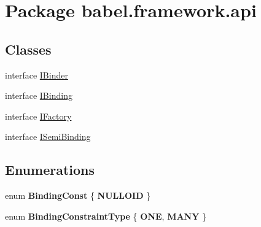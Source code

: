 \hypertarget{namespacebabel_1_1framework_1_1api}{\section{Package babel.\-framework.\-api}
\label{namespacebabel_1_1framework_1_1api}
}
\subsection*{Classes}
\begin{DoxyCompactItemize}
\item 
interface \hyperlink{interfacebabel_1_1framework_1_1api_1_1_i_binder}{I\-Binder}
\item 
interface \hyperlink{interfacebabel_1_1framework_1_1api_1_1_i_binding}{I\-Binding}
\item 
interface \hyperlink{interfacebabel_1_1framework_1_1api_1_1_i_factory}{I\-Factory}
\item 
interface \hyperlink{interfacebabel_1_1framework_1_1api_1_1_i_semi_binding}{I\-Semi\-Binding}
\end{DoxyCompactItemize}
\subsection*{Enumerations}
\begin{DoxyCompactItemize}
\item 
enum {\bfseries Binding\-Const} \{ {\bfseries N\-U\-L\-L\-O\-I\-D}
 \}
\item 
enum {\bfseries Binding\-Constraint\-Type} \{ {\bfseries O\-N\-E}, 
{\bfseries M\-A\-N\-Y}
 \}
\end{DoxyCompactItemize}

